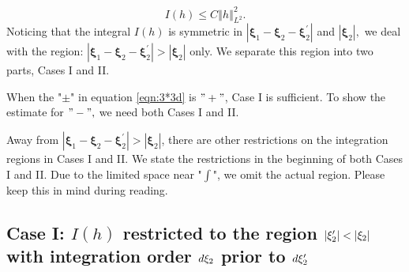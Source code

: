 \documentclass[reqno]{amsart}
\theoremstyle{plain}
\numberwithin{equation}{section}
\begin{document}
\begin{equation*}
I(h)\leqslant C\left\Vert h\right\Vert _{L^{2}}^{2}.
\end{equation*}Noticing that the integral $I(h)$ is symmetric in $\left\vert \mathbf{\xi }_{1}-\mathbf{\xi }_{2}-\mathbf{\xi }_{2}^{\prime }\right\vert $ and $\left\vert \mathbf{\xi }_{2}\right\vert ,$ we deal with the region: $\left\vert \mathbf{\xi }_{1}-\mathbf{\xi }_{2}-\mathbf{\xi }_{2}^{\prime
}\right\vert >\left\vert \mathbf{\xi }_{2}\right\vert $ only. We separate
this region into two parts, Cases I and II.

When the "$\pm $" in equation \ref{eqn:3*3d} is $"+"$, Case I is sufficient.
To show the estimate for $"-",$ we need both Cases I and II.

Away from $\left\vert \mathbf{\xi }_{1}-\mathbf{\xi }_{2}-\mathbf{\xi }_{2}^{\prime }\right\vert >\left\vert \mathbf{\xi }_{2}\right\vert $, there
are other restrictions on the integration regions in Cases I and II. We
state the restrictions in the beginning of both Cases I and II. Due to the
limited space near "$\int $", we omit the actual region. Please keep this in
mind during reading.

\subsection{Case I: $I(h)$ restricted to the region $\left\vert \mathbf{\protect\xi }_{2}^{\prime }\right\vert <\left\vert \mathbf{\protect\xi }_{2}\right\vert $ with integration order $d\mathbf{\protect\xi }_{2}$ prior
to $d\mathbf{\protect\xi }_{2}^{\prime }$}
\end{document}
